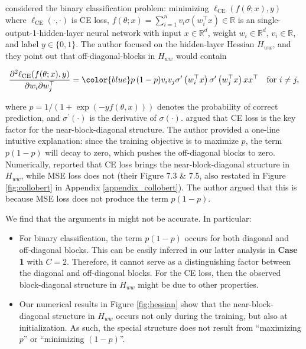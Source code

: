 \documentclass{article}
\newcommand{\1}{^{(1)}}
\newcommand{\2}{^{(2)}}
\newcommand{\BLUE}[1]{{\color{blue} #1}}
\begin{document}
\citet{collobert2004large} considered  the binary classification problem: minimizing $\ell_{\operatorname{CE}}  (f(\theta; x), y)$ where $\ell_{\operatorname{CE}} (\cdot,\cdot)$ is  CE  loss, $f(\theta; x) = \sum_{i = 1}^{n} v_i \sigma(w_i^{\top}x) \in \mathbb{R}$ is  an single-output-1-hidden-layer neural network with input $x \in \mathbb{R}^{d}$, weight $w_i \in \mathbb{R}^{d}$,  $v_i \in \mathbb{R}$, and label $y  \in \{0,1\}$. The author focused on the hidden-layer Hessian $H_{ww}$, and they point out that  off-diagonal-blocks in $H_{ww}$ would contain
\begin{small}\begin{equation}
\label{eq_hessian_calculation_collobert}
    \frac{\partial^2 \ell_{\operatorname{CE}} (f(\theta; x), y) }{\partial w_i \partial w_j^\top}=\BLUE{p \left(1 - p\right)}v_i v_j \sigma^{\prime}\left(w_i^\top x \right) \sigma^{\prime}\left(w_j^\top x \right) x x^\top \quad \text{for } i \neq j, 
\end{equation}
\end{small}
where $p = 1 /(1 + \exp (-y f(\theta,x)))$ denotes the probability of correct prediction, and $\sigma^{\prime}(\cdot)$ is the derivative of $\sigma(\cdot)$.
\citet{collobert2004large} argued that CE loss is the key factor for the near-block-diagonal structure.  The author provided a one-line intuitive explanation:   since the training objective is to maximize $p$,  the term \BLUE{$p \left(1 - p\right)$}
will decay to zero, which pushes the off-diagonal blocks to zero. Numerically, \citet{collobert2004large} reported that CE loss brings the near-block-diagonal structure in $H_{ww}$, while  MSE loss does not (their Figure 7.3 \& 7.5, also restated in Figure \ref{fig:collobert} in Appendix \ref{appendix_collobert}).
The author argued that this is because MSE loss does not produce the term \BLUE{$p \left(1 - p\right)$}. 

We find that the arguments in \citep{collobert2004large} might not be accurate. In particular:

\begin{itemize}
[topsep=1pt,parsep=1pt,partopsep=1pt, leftmargin=*]
    \item[1.] For binary classification, the term \BLUE{$p(1-p)$} occurs for both diagonal and off-diagonal blocks. This can be easily inferred in our latter analysis in {\bf Case 1} with $C =2$. Therefore, it cannot serve as a distinguishing factor between the diagonal and off-diagonal blocks. For the CE loss, then the observed block-diagonal structure in $H_{ww}$ might be due to other properties.
    \item[2.] Our numerical results in Figure \ref{fig:hessian} show that the near-block-diagonal structure in $H_{ww}$ occurs not only during the training, but also at initialization. As such, the special structure does not result from  ``maximizing $p$'' or ``minimizing $(1-p)$''.
\end{itemize}
\end{document}
